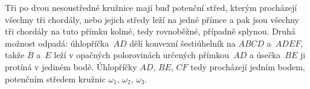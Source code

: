 {    Tři po dvou nesoustředné kružnice mají buď potenční střed, kterým procházejí všechny tři chordály, nebo jejich středy leží na jedné přímce a pak jsou všechny tři chordály na tuto přímku kolmé, tedy rovnoběžné, případně splynou. Druhá možnost odpadá: úhlopříčka~$AD$ dělí konvexní šestiúhelník na $ABCD$ a~$ADEF$, takže $B$ a~$E$ leží v opačných polorovinách určených přímkou~$AD$ a úsečka~$BE$ ji protíná v jediném bodě. Úhlopříčky $AD$, $BE$, $CF$ tedy procházejí jedním bodem, potenčním středem kružnic $\omega_1$, $\omega_2$, $\omega_3$.
}

\DisplayHints

\bye
